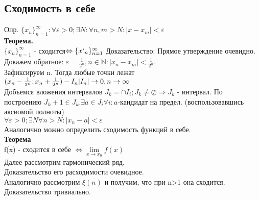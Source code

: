 \documentclass{article}
\begin{document}
\subsection{Сходимость в себе}
Опр. $\lbrace x_n \rbrace_{n=1}^{\infty}: \forall \varepsilon >0; \exists N: \forall n,m > N: |x-x_m|<\varepsilon$\\
\textbf{Теорема.}\\
$\lbrace x_n \rbrace_{n=1}^{\infty}$ - сходится$\Leftrightarrow \lbrace x`_n \rbrace_{n=1}^{\infty}$
Доказательство:
Прямое утверждение очевидно.\\
Докажем обратное: $\varepsilon = \frac{1}{2^n}, n\in \mathbb{N}: |x_n-x_m|<\frac{1}{2^n}$.\\
Зафиксируем n. Тогда любые точки лежат $(x_n-\frac{1}{2^n};x_n+\frac{1}{2^n}) - I_n\\
|I_n| \to 0, n \to \infty$\\
Добъемся вложения интервалов $J_k = \cap I_i; J_k \neq \oslash \Rightarrow J_k$ - интервал. По построению $J_k+1 \in J_k. \exists a \in J_i \forall i: a$-кандидат на предел. (воспользовавшись аксиомой полноты)\\
$\forall \varepsilon >0; \exists N \forall n > N: |x_n-a|<\varepsilon$\\
Аналогично можно определить сходимость функций в себе.\\
\textbf{Теорема}\\
f(x) - сходится в себе $\Leftrightarrow \lim\limits_{x \to x_0} f(x)$\\
Далее рассмотрим гармонический ряд.\\ Доказательство его расходимости очевидное.\\
Аналогично рассмотрим $\xi (n)$ и получим, что при n>1 она сходится. Доказательство тривиально.\\
\end{document}
